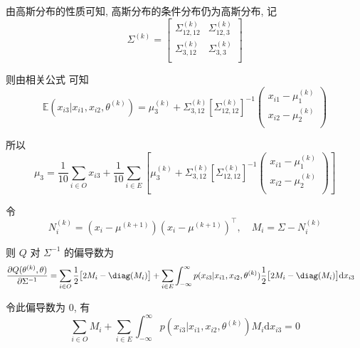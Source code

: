 \documentclass[openany]{ctexbook}
\theoremstyle{kaiti}
\theoremstyle{normal}
\begin{document}
由高斯分布的性质可知, 高斯分布的条件分布仍为高斯分布, 记
\begin{equation}
  \Sigma^{(k)}=
  \begin{bmatrix}
    \Sigma_{12,12}^{(k)} & \Sigma_{12,3}^{(k)}\\
    \Sigma_{3,12}^{(k)}  & \Sigma_{3,3}^{(k)} \\
  \end{bmatrix}
\end{equation}

则由相关公式 \cite{2021pig,2006wang,2009lauritzen} 可知
\begin{equation}
  \mathbb{E}(x_{i3}|x_{i1},x_{i2},\theta^{(k)})=\mu_3^{(k)}+\Sigma_{3,12}^{(k)}\left[\Sigma_{12,12}^{(k)}\right]^{-1}
  \begin{pmatrix}
    x_{i1}-\mu_1^{(k)}\\
    x_{i2}-\mu_2^{(k)}\\
  \end{pmatrix}
\end{equation}

所以
\begin{equation}
  \mu_3=\frac{1}{10}\sum_{i\in O}x_{i3}+\frac{1}{10}\sum_{i\in E}\left[\mu_3^{(k)}+\Sigma_{3,12}^{(k)}\left[\Sigma_{12,12}^{(k)}\right]^{-1}
  \begin{pmatrix}
    x_{i1}-\mu_1^{(k)}\\
    x_{i2}-\mu_2^{(k)}\\
  \end{pmatrix}\right]
\end{equation}

令
\begin{equation}
  N_i^{(k)}=(x_i-\mu^{(k+1)})(x_i-\mu^{(k+1)})^{\top},\quad M_i=\Sigma-N_i^{(k)}
\end{equation}

则 $Q$ 对 $\Sigma^{-1}$ 的偏导数为
\begin{equation}
  \begin{aligned}
    \frac{\partial Q(\theta^{(k)},\theta)}{\partial\Sigma^{-1}}
    &=\sum_{i\in O}\frac{1}{2}\big[2M_i-\diag(M_i)\big]+\sum_{i\in E}\int_{-\infty}^\infty p(x_{i3}|x_{i1},x_{i2},\theta^{(k)})\frac{1}{2}\big[2M_i-\diag(M_i)\big]\mathrm{d}x_{i3}
  \end{aligned}
\end{equation}

令此偏导数为 0, 有
\begin{equation}
  \sum_{i\in O}M_i+\sum_{i\in E}\int_{-\infty}^\infty p(x_{i3}|x_{i1},x_{i2},\theta^{(k)})M_i\mathrm{d}x_{i3}=0
\end{equation}
\end{document}
